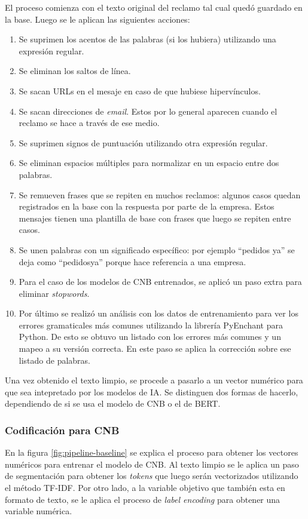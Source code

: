 El proceso comienza con el texto original del reclamo tal cual quedó guardado en la base. Luego se le aplican las siguientes acciones:
\begin{enumerate}
	\item Se suprimen los acentos de las palabras (si los hubiera) utilizando una expresión regular.
	\item Se eliminan los saltos de línea.
	\item Se sacan URLs en el mesaje en caso de que hubiese hipervínculos.
	\item Se sacan direcciones de \textit{email}. Estos por lo general aparecen cuando el reclamo se hace a través de ese medio.
	\item Se suprimen signos de puntuación utilizando otra expresión regular.
	\item Se eliminan espacios múltiples para normalizar en un espacio entre dos palabras.
	\item Se remueven frases que se repiten en muchos reclamos: algunos casos quedan registrados en la base con la respuesta por parte de la empresa. Estos mensajes tienen una plantilla de base con frases que luego se repiten entre casos.
	\item Se unen palabras con un significado específico: por ejemplo ``pedidos ya'' se deja como ``pedidosya'' porque hace referencia a una empresa.
	\item Para el caso de los modelos de CNB entrenados, se aplicó un paso extra para eliminar \textit{stopwords}.
	\item Por último se realizó un análisis con los datos de entrenamiento para ver los errores gramaticales más comunes utilizando la librería PyEnchant para Python. De esto se obtuvo un listado con los errores más comunes y un mapeo a su versión correcta. En este paso se aplica la corrección sobre ese listado de palabras.
\end{enumerate}

Una vez obtenido el texto limpio, se procede a pasarlo a un vector numérico para que sea intepretado por los modelos de IA. Se distinguen dos formas de hacerlo, dependiendo de si se usa el modelo de CNB o el de BERT.

\subsubsection{Codificación para CNB}

En la figura \ref{fig:pipeline-baseline} se explica el proceso para obtener los vectores numéricos para entrenar el modelo de CNB. Al texto limpio se le aplica un paso de segmentación para obtener los \textit{tokens} que luego serán vectorizados utilizando el método TF-IDF. Por otro lado, a la variable objetivo que también esta en formato de texto, se le aplica el proceso de \textit{label encoding} para obtener una variable numérica. 

